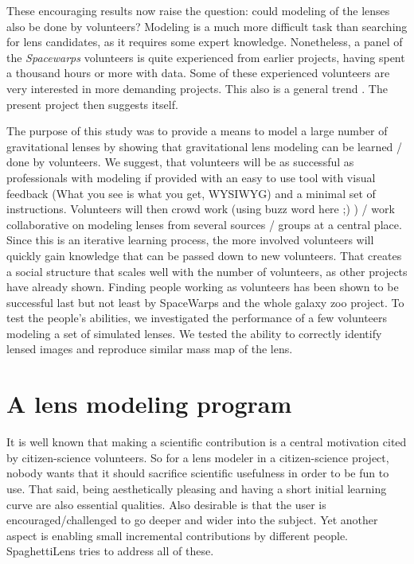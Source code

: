 \documentclass[12pt,preprint]{aastex}
\newcommand{\spl}{SpaghettiLens\xspace}
\newcommand{\sw}{SpaceWarps\xspace}
\newcommand{\todo}[2][red]{%
\textcolor{#1}{\textbullet}%
\marginpar{\colorbox{#1}{\parbox{\marginparwidth}{%
\setstretch{0.4}\sffamily\textcolor{black}{\scriptsize{#2}}}}}}
\newcommand{\needcite}[1][]{\todo[green]{cit #1}}
\begin{document}
These encouraging results now raise the question: could modeling of
the lenses also be done by volunteers?  Modeling is a much more
difficult task than searching for lens candidates, as it requires some
expert knowledge.  Nonetheless, a panel of the {\em Spacewarps\/}
volunteers is quite experienced from earlier projects, having spent a
thousand hours or more with data.  Some of these experienced
volunteers are very interested in more demanding projects.  This also
is a general trend \citep[cf.][]{Khatib22112011}.  The present project
then suggests itself.

The purpose of this study was to provide a means to model a large number of gravitational lenses by showing that gravitational lens modeling can be learned / done by volunteers.
We suggest, that volunteers will be as successful as professionals with modeling if provided with an easy to use tool with visual feedback (What you see is what you get, WYSIWYG) and a minimal set of instructions.
Volunteers will then crowd work (using buzz word here ;) ) / work collaborative on modeling lenses from several sources / groups at a central place.
Since this is an iterative learning process, the more involved volunteers will quickly gain knowledge that can be passed down to new volunteers.
That creates a social structure that scales well with the number of volunteers, as other projects\needcite have already shown.
Finding people working as volunteers has been shown to be successful last but not least by \sw and the whole galaxy zoo project.
To test the people's abilities, we investigated the performance of a few volunteers modeling a set of simulated lenses.
We tested the ability to correctly identify lensed images and reproduce similar mass map of the lens.


\section{A lens modeling program}

It is well known that making a scientific contribution is a central
motivation cited by citizen-science volunteers.  So for a lens
modeler in a citizen-science project, nobody wants that it should
sacrifice scientific usefulness in order to be fun to use.  That said,
being aesthetically pleasing and having a short initial learning curve
are also essential qualities.  Also desirable is that the user is
encouraged/challenged to go deeper and wider into the subject.
Yet another aspect is enabling small incremental contributions
by different people.  \spl tries to address all of these.
\end{document}
